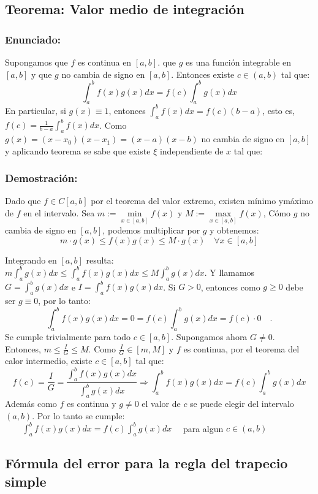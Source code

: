\documentclass[a4paper,12pt]{article}
\begin{document}
\subsection{Teorema: Valor medio de integración}
\subsubsection{Enunciado:}

Supongamos que $f$ es continua en $[a,b]$. que $g$ es una función integrable en $[a,b]$ y que $g$ no cambia de signo en $[a,b]$. Entonces existe $c \in (a,b)$ tal que:
\[
\int_a^b f(x)g(x)dx = f(c)\int_a^b g(x)dx
\]
En particular, si $g(x)\equiv 1$, entonces $\int_a^b f(x)dx=f(c)(b-a)$, esto es, $f(c)=\frac{1}{b-a}\int_a^b f(x)dx$. Como $g(x)=(x-x_0)(x-x_1)=(x-a)(x-b)$ no cambia de signo en $[a,b]$ y aplicando teorema se sabe que existe $\xi$ independiente de $x$ tal que:

\subsubsection{Demostración:}
Dado que $f\in C[a,b]$ por el teorema del valor extremo, existen mínimo ymáximo de $f$ en el intervalo. Sea $m:= \min \limits_{x \in [a,b]} f(x)$ y $M:= \max \limits_{x \in [a,b]} f(x)$, Cómo $g$ no cambia de signo en $[a,b]$, podemos multiplicar por $g$ y obtenemos:
\[
m\cdot g(x) \leq f(x)g(x) \leq M\cdot g(x) \quad \forall x \in [a,b]
\]

Integrando en $[a,b]$ resulta: $m\int_a^b g(x)dx \leq \int_a^b f(x)g(x)dx \leq M\int_a^b g(x)dx$. Y llamamos $G=\int_a^b g(x)dx$ e $I=\int_a^b f(x)g(x)dx$.
Si $G>0$, entonces como $g\geq 0$ debe ser $g \equiv 0$, por lo tanto:
\[
\int_a^b f(x)g(x)dx = 0 = f(c)\int_a^b g(x)dx=f(c)\cdot 0 \quad.
\]
Se cumple trivialmente para todo $c \in [a,b]$. Supongamos ahora $G\neq 0$. Entonces, $m\leq \frac{I}{G}\leq M$. Como $\frac{I}{G} \in [m,M]$ y $f$ es continua, por el teorema del calor intermedio, existe $c \in [a,b]$ tal que:
\[
f(c)=\frac{I}{G}=\frac{\int_a^b f(x)g(x)dx}{\int_a^b g(x)dx} \Rightarrow \int_a^b f(x)g(x)dx = f(c)\int_a^b g(x)dx 
\]
Además como $f$ es continua y $g\neq 0$ el valor de $c$ se puede elegir del intervalo $(a,b)$.
Por lo tanto se cumple:\\

$\qquad\int_a^b f(x)g(x)dx = f(c)\int_a^b g(x)dx \quad$ para algun $c \in (a,b)$

\subsection{Fórmula del error para la regla del trapecio simple}
\end{document}
